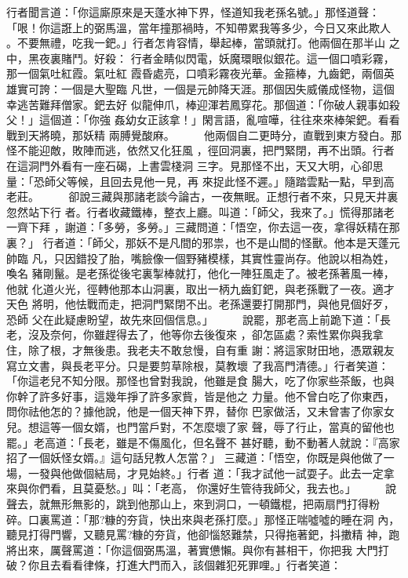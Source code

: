 \begin{pinyinscope}
{行者聞言道：「你這廝原來是天蓬水神下界，怪道知我老孫名號。」那怪道聲：
「哏！你這誑上的弼馬溫，當年撞那禍時，不知帶累我等多少，今日又來此欺人
。不要無禮，吃我一鈀。」行者怎肯容情，舉起棒，當頭就打。他兩個在那半山
之中，黑夜裏賭鬥。好殺：
行者金睛似閃電，妖魔環眼似銀花。這一個口噴彩霧，那一個氣吐紅霞。氣吐紅
霞昏處亮，口噴彩霧夜光華。金箍棒，九齒鈀，兩個英雄實可誇：一個是大聖臨
凡世，一個是元帥降天涯。那個因失威儀成怪物，這個幸逃苦難拜僧家。鈀去好
似龍伸爪，棒迎渾若鳳穿花。那個道：「你破人親事如殺父！」這個道：「你強
姦幼女正該拿！」閑言語，亂喧嘩，往往來來棒架鈀。看看戰到天將曉，那妖精
兩膊覺酸麻。
　　
他兩個自二更時分，直戰到東方發白。那怪不能迎敵，敗陣而逃，依然又化狂風
，徑回洞裏，把門緊閉，再不出頭。行者在這洞門外看有一座石碣，上書雲棧洞
三字。見那怪不出，天又大明，心卻思量：「恐師父等候，且回去見他一見，再
來捉此怪不遲。」隨踏雲點一點，早到高老莊。
　　
卻說三藏與那諸老談今論古，一夜無眠。正想行者不來，只見天井裏忽然站下行
者。行者收藏鐵棒，整衣上廳。叫道：「師父，我來了。」慌得那諸老一齊下拜
，謝道：「多勞，多勞。」三藏問道：「悟空，你去這一夜，拿得妖精在那裏？」
行者道：「師父，那妖不是凡間的邪祟，也不是山間的怪獸。他本是天蓬元帥臨
凡，只因錯投了胎，嘴臉像一個野豬模樣，其實性靈尚存。他說以相為姓，喚名
豬剛鬣。是老孫從後宅裏掣棒就打，他化一陣狂風走了。被老孫著風一棒，他就
化道火光，徑轉他那本山洞裏，取出一柄九齒釘鈀，與老孫戰了一夜。適才天色
將明，他怯戰而走，把洞門緊閉不出。老孫還要打開那門，與他見個好歹，恐師
父在此疑慮盼望，故先來回個信息。」
　　
說罷，那老高上前跪下道：「長老，沒及奈何，你雖趕得去了，他等你去後復來
，卻怎區處？索性累你與我拿住，除了根，才無後患。我老夫不敢怠慢，自有重
謝：將這家財田地，憑眾親友寫立文書，與長老平分。只是要剪草除根，莫教壞
了我高門清德。」行者笑道：「你這老兒不知分限。那怪也曾對我說，他雖是食
腸大，吃了你家些茶飯，也與你幹了許多好事，這幾年掙了許多家貲，皆是他之
力量。他不曾白吃了你東西，問你祛他怎的？據他說，他是一個天神下界，替你
巴家做活，又未曾害了你家女兒。想這等一個女婿，也門當戶對，不怎麼壞了家
聲，辱了行止，當真的留他也罷。」老高道：「長老，雖是不傷風化，但名聲不
甚好聽，動不動著人就說：『高家招了一個妖怪女婿。』這句話兒教人怎當？」
三藏道：「悟空，你既是與他做了一場，一發與他做個結局，才見始終。」行者
道：「我才試他一試耍子。此去一定拿來與你們看，且莫憂愁。」叫：「老高，
你還好生管待我師父，我去也。」
　　
說聲去，就無形無影的，跳到他那山上，來到洞口，一頓鐵棍，把兩扇門打得粉
碎。口裏罵道：「那?糠的夯貨，快出來與老孫打麼。」那怪正喘噓噓的睡在洞
內，聽見打得門響，又聽見罵?糠的夯貨，他卻惱怒難禁，只得拖著鈀，抖擻精
神，跑將出來，厲聲罵道：「你這個弼馬溫，著實憊懶。與你有甚相干，你把我
大門打破？你且去看看律條，打進大門而入，該個雜犯死罪哩。」行者笑道：
}
\end{pinyinscope}

